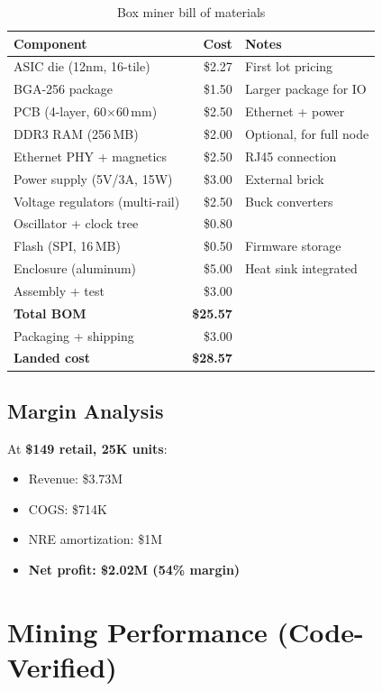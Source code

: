 \documentclass[11pt,a4paper]{article}
\begin{document}
\begin{table}[h]
\centering
\begin{tabular}{lrl}
\toprule
\textbf{Component} & \textbf{Cost} & \textbf{Notes} \\
\midrule
ASIC die (12nm, 16-tile) & \$2.27 & First lot pricing \\
BGA-256 package & \$1.50 & Larger package for IO \\
PCB (4-layer, 60$\times$60\,mm) & \$2.50 & Ethernet + power \\
DDR3 RAM (256\,MB) & \$2.00 & Optional, for full node \\
Ethernet PHY + magnetics & \$2.50 & RJ45 connection \\
Power supply (5V/3A, 15W) & \$3.00 & External brick \\
Voltage regulators (multi-rail) & \$2.50 & Buck converters \\
Oscillator + clock tree & \$0.80 & \\
Flash (SPI, 16\,MB) & \$0.50 & Firmware storage \\
Enclosure (aluminum) & \$5.00 & Heat sink integrated \\
Assembly + test & \$3.00 & \\
\midrule
\textbf{Total BOM} & \textbf{\$25.57} & \\
Packaging + shipping & \$3.00 & \\
\midrule
\textbf{Landed cost} & \textbf{\$28.57} & \\
\bottomrule
\end{tabular}
\caption{Box miner bill of materials}
\end{table}

\subsection{Margin Analysis}

At \textbf{\$149 retail, 25K units}:
\begin{itemize}[noitemsep]
    \item Revenue: \$3.73M
    \item COGS: \$714K
    \item NRE amortization: \$1M
    \item \textbf{Net profit: \$2.02M (54\% margin)}
\end{itemize}

\section{Mining Performance (Code-Verified)}
\end{document}
